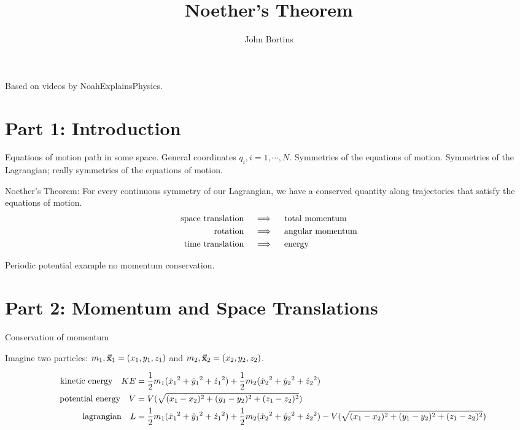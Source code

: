 \documentclass{article}
\title{Noether's Theorem}
\author{John Bortins}
\begin{document}
\maketitle{}

Based on videos by NoahExplainsPhysics.

\section*{Part 1: Introduction}
Equations of motion path in some space.
General coordinates $q_i, i=1, \cdots, N$.
Symmetries of the equations of motion. Symmetries of the Lagrangian; really symmetries of the equations of motion.

Noether's Theorem: For every continuous symmetry of our Lagrangian, we have a conserved quantity along trajectories that satisfy the equations of motion.
\begin{align*}
    \qq{space translation} & \implies\qq{total momentum}   \\
    \qq{rotation}          & \implies\qq{angular momentum} \\
    \qq{time translation}  & \implies\qq{energy}           \\
\end{align*}

Periodic potential example no momentum conservation.


\section*{Part 2: Momentum and Space Translations}

Conservation of momentum

Imagine two particles: ${m_1, \va{x}_1=(x_1, y_1, z_1)}$ and ${m_2, \va{x}_2=(x_2, y_2, z_2)}$.

\begin{align*}
    \qq{kinetic energy} KE & = \frac{1}{2}m_1(\dot{x}_1{^2}+\dot{y}_1{^2}+\dot{z}_1{^2})+\frac{1}{2}m_2(\dot{x}_2{^2}+\dot{y}_2{^2}+\dot{z}_2{^2})                                                  \\
    \qq{potential energy}V & = V(\sqrt{(x_1 -x_2)^2+(y_1 -y_2)^2+(z_1 -z_2)^2})                                                                                                                     \\
    \qq{lagrangian} L      & = \frac{1}{2}m_1(\dot{x}_1{^2}+\dot{y}_1{^2}+\dot{z}_1{^2})+\frac{1}{2}m_2(\dot{x}_2{^2}+\dot{y}_2{^2}+\dot{z}_2{^2})-V(\sqrt{(x_1 -x_2)^2+(y_1 -y_2)^2+(z_1 -z_2)^2})
\end{align*}
\end{document}
